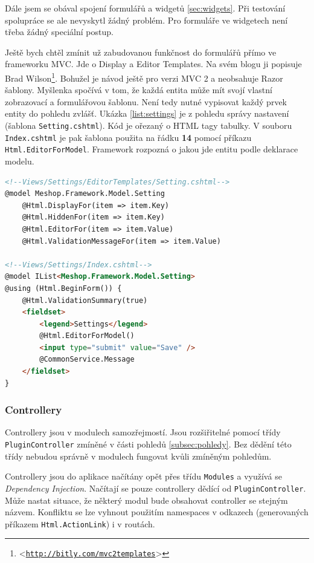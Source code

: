 \documentclass[11pt,twoside,a4paper]{book}
\let\oldUrl\url
\renewcommand\url[1]{<\texttt{\oldUrl{#1}}>}
\begin{document}
Dále jsem se obával spojení formulářů a widgetů \ref{sec:widgets}. Při testování spolupráce se ale nevyskytl žádný problém. Pro formuláře ve widgetech není třeba žádný speciální postup.

Ještě bych chtěl zmínit už zabudovanou funkčnost do formulářů přímo ve frameworku MVC. Jde o \textsf{Display} a \textsf{Editor Templates}. Na svém blogu ji popisuje Brad Wilson\footnote{\url{http://bitly.com/mvc2templates}}. Bohužel je návod ještě pro verzi MVC 2 a neobsahuje Razor šablony. Myšlenka spočívá v tom, že každá entita může mít svojí vlastní zobrazovací a formulářovou šablonu. Není tedy nutné vypisovat každý prvek entity do pohledu zvlášť. Ukázka \ref{list:settings} je z pohledu správy nastavení (šablona \texttt{Setting.cshtml}). Kód je ořezaný o HTML tagy tabulky. V souboru \texttt{Index.cshtml} je pak šablona použita na řádku \textbf{14} pomocí příkazu \texttt{Html.EditorForModel}. Framework rozpozná o jakou jde entitu podle deklarace modelu.

\begin{lstlisting}[float=h!,language=HTML, caption={šablony pro formuláře}, label=list:settings]
<!--Views/Settings/EditorTemplates/Setting.cshtml-->
@model Meshop.Framework.Model.Setting
	@Html.DisplayFor(item => item.Key)
	@Html.HiddenFor(item => item.Key)
	@Html.EditorFor(item => item.Value)
	@Html.ValidationMessageFor(item => item.Value)

<!--Views/Settings/Index.cshtml-->
@model IList<Meshop.Framework.Model.Setting>
@using (Html.BeginForm()) {
    @Html.ValidationSummary(true)
    <fieldset>
        <legend>Settings</legend>
        @Html.EditorForModel()
        <input type="submit" value="Save" /> 
        @CommonService.Message
    </fieldset>
}
\end{lstlisting}

\subsubsection{Controllery}

Controllery jsou v modulech samozřejmostí. Jsou rozšiřitelné pomocí třídy \texttt{PluginController} zmíněné v části pohledů \ref{subsec:pohledy}. Bez dědění této třídy nebudou správně v modulech fungovat kvůli zmíněným pohledům.

Controllery jsou do aplikace načítány opět přes třídu \texttt{Modules} a využívá se \textit{Dependency Injection}. Načítají se pouze controllery dědící od \texttt{PluginController}. Může nastat situace, že některý modul bude obsahovat controller se stejným názvem. Konfliktu se lze vyhnout použitím namespaces v odkazech (generovaných příkazem \texttt{Html.ActionLink}) i v routách.
\end{document}
